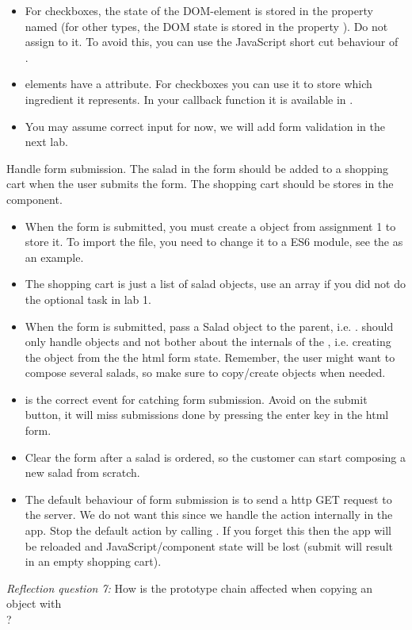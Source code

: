 \documentclass[fleqn, article, a4paper]{memoir}
\begin{document}
\begin{Assignments}
\begin{itemize}
  \item For checkboxes, the state of the DOM-element is stored in the property named  (for other  types, the DOM state is stored in the property ). Do not assign  to it. To avoid this, you can use the JavaScript short cut behaviour of \code{||} \\ .
  \item {} elements have a  attribute. For checkboxes you can use it to store which ingredient it represents. In your callback function it is available in .
  \item You may assume correct input for now, we will add form validation in the next lab.
\end{itemize}

\item Handle form submission. The salad in the form should be added to a shopping cart when the user submits the form. The shopping cart should be stores in the  component.
\begin{itemize}
  \item When the form is submitted, you must create a  object from assignment 1 to store it. To import the file, you need to change it to a ES6 module, see the  as an example.
  \item The shopping cart is just a list of salad objects, use an array if you did not do the optional task in lab 1.
  \item When the form is submitted, pass a Salad object to the parent, i.e. .  should only handle  objects and not bother about the internals of the , i.e. creating the object from the the html form state. Remember, the user might want to compose several salads, so make sure to copy/create objects when needed.
  \item {} is the correct event for catching form submission. Avoid  on the submit button, it will miss submissions done by pressing the enter key in the html form.
  \item Clear the form after a salad is ordered, so the customer can start composing a new salad from scratch.
  \item The default behaviour of form submission is to send a http GET request to the server. We do not want this since we handle the action internally in the app. Stop the default action by calling . If you forget this then the app will be reloaded and JavaScript/component state will be lost (submit will result in an empty shopping cart).
\end{itemize}
\emph{Reflection question 7:} How is the prototype chain affected when copying an object with \\?


\end{Assignments}
\end{document}
